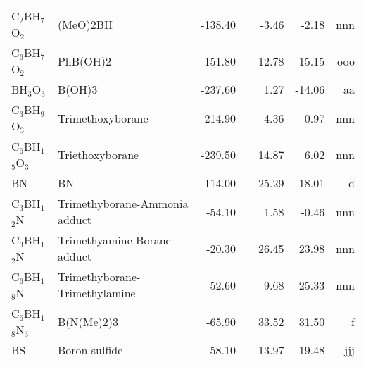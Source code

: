 \begin{table}
\begin{center}
\begin{tabular}{llrrrrr}
 C$_2$BH$_7$O$_2$     & (MeO)2BH                       &  -138.40    &  &    -3.46  &    -2.18  &    nnn\\
 C$_6$BH$_7$O$_2$     & PhB(OH)2                       &  -151.80    &  &    12.78  &    15.15  &    ooo\\
 BH$_3$O$_3$       & B(OH)3                         &  -237.60    &  &     1.27  &   -14.06  &     aa\\
 C$_3$BH$_9$O$_3$     & Trimethoxyborane               &  -214.90    &  &     4.36  &    -0.97  &    nnn\\
 C$_6$BH$_1$$_5$O$_3$    & Triethoxyborane                &  -239.50    &  &    14.87  &     6.02  &    nnn\\
 BN          & BN                             &   114.00    &  &    25.29  &    18.01  &      d\\
 C$_3$BH$_1$$_2$N     & Trimethyborane-Ammonia adduct  &   -54.10    &  &     1.58  &    -0.46  &    nnn\\
 C$_3$BH$_1$$_2$N     & Trimethyamine-Borane adduct    &   -20.30    &  &    26.45  &    23.98  &    nnn\\
 C$_6$BH$_1$$_8$N     & Trimethyborane-Trimethylamine  &   -52.60    &  &     9.68  &    25.33  &    nnn\\
 C$_6$BH$_1$$_8$N$_3$    & B(N(Me)2)3                     &   -65.90    &  &    33.52  &    31.50  &      f\\
 BS          & Boron sulfide                  &    58.10    &  &    13.97  &    19.48  &    jjj\\
\hline
\end{tabular}
\end{center}
\end{table}
\clearpage

